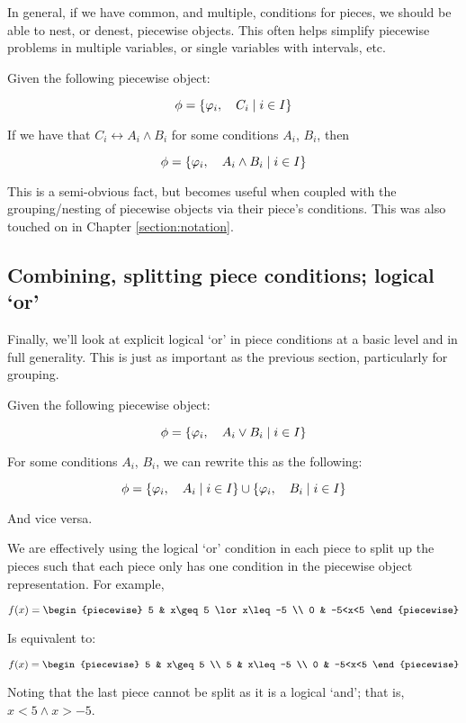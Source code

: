 In general, if we have common, and multiple, conditions for pieces, we should be able to nest, or denest, piecewise objects. This often helps simplify piecewise problems in multiple variables, or single variables with intervals, etc.

\begin{theorem}
    Given the following piecewise object:

    $$
        \phi=\{\varphi_i,\quad C_i\mid i\in I\}
    $$

    If we have that $C_i\leftrightarrow A_i\land B_i$ for some conditions $A_i$, $B_i$, then

    $$
        \phi=\{\varphi_i,\quad A_i\land B_i\mid i\in I\}
    $$

    This is a semi-obvious fact, but becomes useful when coupled with the grouping/nesting of piecewise objects via their piece's conditions. This was also touched on in Chapter \ref{section:notation}.
\end{theorem}
\subsection{Combining, splitting piece conditions; logical `or'}
Finally, we'll look at explicit logical `or' in piece conditions at a basic level and in full generality. This is just as important as the previous section, particularly for grouping.

\begin{theorem}
    Given the following piecewise object:

    $$
        \phi=\{\varphi_i,\quad A_i\lor B_i\mid i\in I\}
    $$

    For some conditions $A_i$, $B_i$, we can rewrite this as the following:

    $$
        \phi=\{\varphi_i,\quad A_i\mid i\in I\}\cup\{\varphi_i,\quad B_i\mid i\in I\}
    $$

    And vice versa.

    We are effectively using the logical `or' condition in each piece to split up the pieces such that each piece only has one condition in the piecewise object representation. For example,

    $$
        f(x) = \begin{piecewise}
            5 & x\geq 5 \lor x\leq -5 \\
            0 & -5<x<5
        \end{piecewise}
    $$

    Is equivalent to:

    $$
        f(x) = \begin{piecewise}
            5 & x\geq 5 \\
            5 & x\leq -5 \\
            0 & -5<x<5
        \end{piecewise}
    $$

    Noting that the last piece cannot be split as it is a logical `and'; that is, $x<5\land x>-5$.
\end{theorem}

